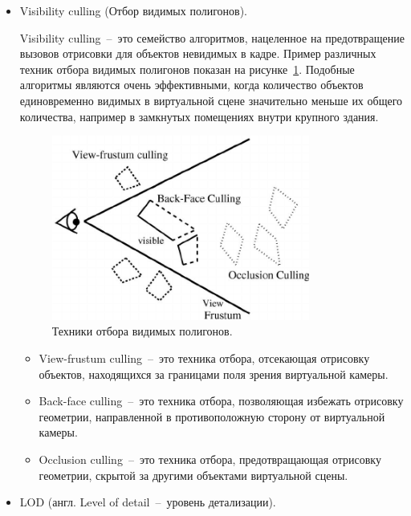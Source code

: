 \begin{itemize}
    \item {
        Visibility culling (Отбор видимых полигонов).

        Visibility culling~--~это семейство алгоритмов,
        нацеленное на предотвращение вызовов отрисовки
        для объектов невидимых в кадре.%
        \cite{Cohenor2002}
        Пример различных техник отбора видимых полигонов
        показан на рисунке~\ref{figure:CullingTechniques}.
        Подобные алгоритмы являются очень эффективными,
        когда количество объектов единовременно видимых в виртуальной сцене
        значительно меньше их общего количества,
        например в замкнутых помещениях внутри крупного здания.

        \begin{figure}[ht]
            \centering
            \includegraphics[width=0.8\textwidth]
            {images/Three-types-of-visibility-culling-techniques.png}
            \caption{Техники отбора видимых полигонов.%
            \cite{Cohenor2002}}
            \label{figure:CullingTechniques}
        \end{figure}

        \begin{itemize}
            \item {
                View-frustum culling~--~это техника отбора,
                отсекающая отрисовку объектов,
                находящихся за границами поля зрения виртуальной камеры.
            }
            \item {
                Back-face culling~--~это техника отбора,
                позволяющая избежать отрисовку геометрии,
                направленной в противоположную сторону от виртуальной камеры.
            }
            \item {
                Occlusion culling~--~это техника отбора,
                предотвращающая отрисовку геометрии,
                скрытой за другими объектами виртуальной сцены.
            }
        \end{itemize}
    }
    \item {
        LOD (англ. Level of detail~--~уровень детализации).

}
\end{itemize}

